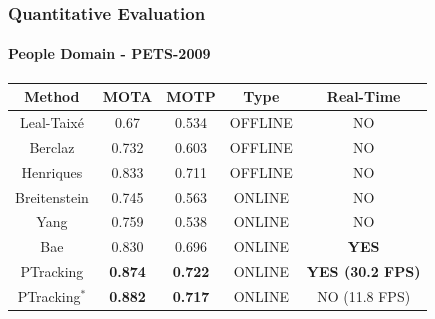 \begin{frame}
	\frametitle{Quantitative Evaluation}
	\framesubtitle{People Domain - PETS-2009}
	
	\large
	
	\begin{table}[!t]
		\renewcommand{\arraystretch}{1.3}
		\centering
		\begin{tabular}{ccccc}
			\hline
			\hline
			\textbf{Method} & \textbf{MOTA} & \textbf{MOTP} & \textbf{Type} & \textbf{Real-Time} \\
			\hline
			Leal-Taix\'{e} \cite{Leal11} & 0.67 & 0.534 & OFFLINE & NO \\
			\hline
			Berclaz \cite{Berclaz11} & 0.732 & 0.603 & OFFLINE & NO \\
			\hline
			Henriques \cite{Henriques11} & 0.833 & 0.711 & OFFLINE & NO \\
			\hline
			Breitenstein \cite{Breitenstein11} & 0.745 & 0.563 & ONLINE & NO \\
			\hline
			Yang \cite{Yang09} & 0.759 & 0.538 & ONLINE & NO \\
			\hline
			Bae \cite{Bae14} & 0.830 & 0.696 & ONLINE & \textbf{YES} \\
			\hline
			PTracking & \textbf{0.874} & \textbf{0.722} & ONLINE & \textbf{YES (30.2 FPS)} \\
			\hline
			PTracking$^*$ & \textbf{0.882} & \textbf{0.717} & ONLINE & NO (11.8 FPS) \\
			\hline
		\hline
		\end{tabular}
	\end{table}
\end{frame}

